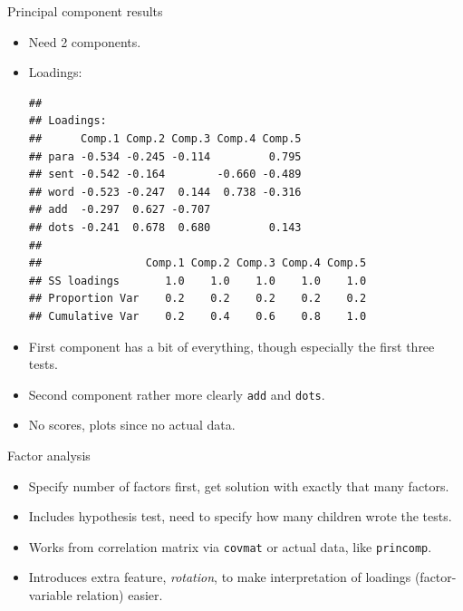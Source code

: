\begin{frame}[fragile]{Principal component results}
  
  \begin{itemize}
  \item Need 2 components.
  \item Loadings:
{\footnotesize
\begin{knitrout}
\color{fgcolor}\begin{kframe}
\begin{alltt}
\hlopt{$}
\end{alltt}
\begin{verbatim}
## 
## Loadings:
##      Comp.1 Comp.2 Comp.3 Comp.4 Comp.5
## para -0.534 -0.245 -0.114         0.795
## sent -0.542 -0.164        -0.660 -0.489
## word -0.523 -0.247  0.144  0.738 -0.316
## add  -0.297  0.627 -0.707              
## dots -0.241  0.678  0.680         0.143
## 
##                Comp.1 Comp.2 Comp.3 Comp.4 Comp.5
## SS loadings       1.0    1.0    1.0    1.0    1.0
## Proportion Var    0.2    0.2    0.2    0.2    0.2
## Cumulative Var    0.2    0.4    0.6    0.8    1.0
\end{verbatim}
\end{kframe}
\end{knitrout}
}
\item First component has a bit of everything, though especially the
  first three tests.
\item Second component rather more clearly \texttt{add} and \texttt{dots}.
\item No scores, plots since no actual data.
  
  \end{itemize}
  
  
  
\end{frame}


\begin{frame}[fragile]{Factor analysis}
  
  \begin{itemize}
  \item Specify number of factors first, get solution with exactly
    that many factors.
  \item Includes hypothesis test, need to specify how many children
    wrote the tests.
  \item Works from correlation matrix via \texttt{covmat} or actual
    data, like \texttt{princomp}.
  \item Introduces extra feature, \emph{rotation}, to make
    interpretation of loadings (factor-variable relation) easier.
  \end{itemize}
  
\end{frame}

